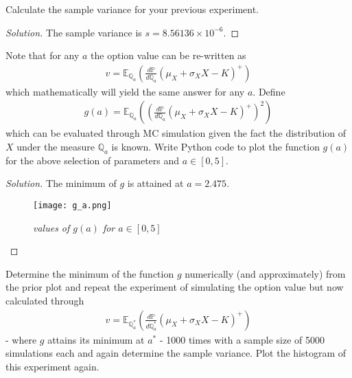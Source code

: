 \documentclass[10pt]{article}
\newcommand{\E}{\mathbb{E}}
\newcommand{\Q}{\mathbb{Q}}
\newenvironment{problem}[2][Problem]{\begin{trivlist}
\item[\hskip \labelsep {\bfseries #1}\hskip \labelsep {\bfseries #2.}]}{\end{trivlist}}
\begin{document}
\begin{problem}{5}
    Calculate the sample variance for your previous experiment.
\end{problem}
    
\begin{proof}[Solution]
    The sample variance is $s = 8.56136 \times 10^{-6}$.
\end{proof}



\begin{problem}{6}
    Note that for any $a$ the option value can be re-written as
    \begin{align*}
        v = \E_{\Q_a} \left(\frac{d\mathbb{P}}{d\Q_a} (\mu_X + \sigma_X X - K)^+\right)
    \end{align*}
    which mathematically will yield the same answer for any $a$. Define
    \begin{align*}
        g(a) = \E_{\Q_a} \left( \left(\frac{d\mathbb{P}}{d\Q_a} (\mu_X + \sigma_X X - K)^+\right)^2 \right)
    \end{align*}
    which can be evaluated through MC simulation given the fact the distribution of $X$ under the measure $\Q_a$ is known.
    Write Python code to plot the function $g(a)$ for the above selection of parameters and $a \in [0, 5]$.
\end{problem}
    
\begin{proof}[Solution]
    The minimum of $g$ is attained at $a = 2.475$.
    \begin{figure}[H]
        \begin{center}
            \texttt{[image: g\_a.png]}
            \caption{\textit{values of $g(a)$ for $a \in [0, 5]$}}
            \label{fig:g_a}
        \end{center}
    \end{figure}
\end{proof}



\begin{problem}{7}
    Determine the minimum of the function $g$ numerically (and approximately) from the prior plot and repeat the experiment of simulating the option value but now calculated through
    \begin{align*}
        v = \E_{\Q_a^*} \left(\frac{d\mathbb{P}}{d\Q_a^*} (\mu_X + \sigma_X X - K)^+\right)
    \end{align*}
    - where $g$ attains its minimum at $a^*$ - 1000 times with a sample size of 5000 simulations each and again determine the sample variance.
    Plot the histogram of this experiment again.
\end{problem}
    
\end{document}
